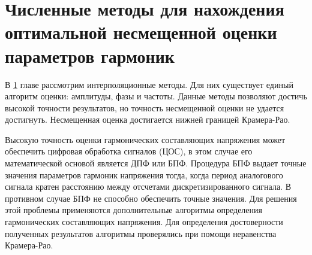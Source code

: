 %
%
%


\chapter{Численные методы для нахождения оптимальной несмещенной оценки параметров гармоник}\label{ch:ch3}
В \ref{ch:ch3} главе рассмотрим интерполяционные методы. Для них существует единый алгоритм оценки: амплитуды, фазы и частоты. Данные методы позволяют достичь высокой точности результатов, но точность несмещенной оценки не удается достигнуть. Несмещенная оценка достигается нижней границей Крамера-Рао. 

Высокую точность оценки гармонических составляющих напряжения может обеспечить цифровая обработка сигналов (ЦОС), в этом случае его математической основой является ДПФ или БПФ. 
Процедура БПФ выдает точные значения параметров гармоник напряжения тогда, когда период аналогового сигнала кратен расстоянию между отсчетами дискретизированного сигнала. В противном случае БПФ не способно обеспечить точные значения. Для решения этой проблемы применяются дополнительные алгоритмы определения гармонических составляющих напряжения. Для определения достоверности полученных результатов алгоритмы проверялись при помощи неравенства Крамера-Рао. 


